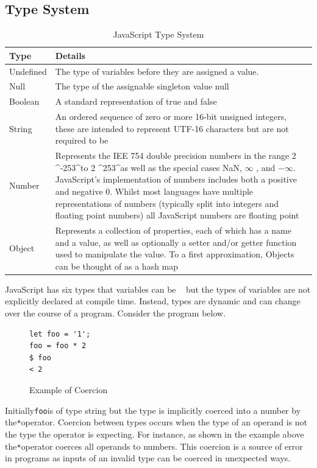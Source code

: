 \documentclass[]{final_report}
\begin{document}
\subsection{Type System}
\begin{table}[h]
\centering
\caption{JavaScript Type System}
\label{type-system}
\begin{tabular}{|l|l|}
\hline
Type & Details \\ \hline
Undefined & The type of variables before they are assigned a value. \\ \hline
Null & The type of the assignable singleton value null\\ \hline
Boolean & A standard representation of true and false \\ \hline
String & An ordered sequence of zero or more 16-bit unsigned integers, these are intended to represent UTF-16 characters but are not required to be \\ \hline
Number & Represents the IEE 754 double precision numbers in the range 2 \textasciicircum -253\textasciicircum  to 2 \textasciicircum 253\textasciicircum  as well as the special cases NaN, $\infty$ , and $ -\infty$. JavaScript's implementation of numbers includes both a positive and negative 0. Whilst most languages have multiple representations of numbers (typically split into integers and floating point numbers) all JavaScript numbers are floating point \\ \hline
Object & Represents a collection of properties, each of which has a name and a value, as well as optionally a setter and/or getter function used to manipulate the value. To a first approximation, Objects can be thought of as a hash map \\ \hline
\end{tabular}
\end{table}

JavaScript has six types that variables can be ~\cite{EcmaScript} but the types of variables are not explicitly declared at compile time. Instead, types are dynamic and can change over the course of a program. Consider the program below.


\begin{figure}[h]
\begin{verbatim}
let foo = '1';
foo = foo * 2
$ foo
< 2
\end{verbatim}
\caption{\label{fig:js-coercion} Example of Coercion}
\end{figure} 

Initially\lstinline{foo}is of type string but the type is implicitly coerced into a number by the\lstinline{*}operator. Coercion between types occurs when the type of an operand is not the type the operator is expecting. For instance, as shown in the example above the\lstinline{*}operator coerces all operands to numbers. This coercion is a source of error in programs as inputs of an invalid type can be coerced in unexpected ways.
\end{document}
